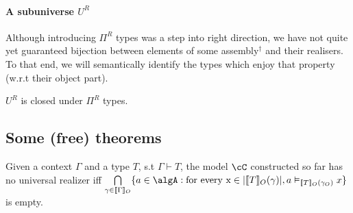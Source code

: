 \documentclass[12pt,a4paper]{article}
\def\src{_{src}}
\def\rfl{_{refl}}
\def\tgt{_{tgt}}
\renewcommand{\O}{_{O}}\alwaysmath{O}
\newcommand{\R}{\ensuremath{_{R}}}
\def\assembly{assembly$^\dagger$\xspace}
\begin{document}
\paragraph*{A subuniverse $U^R$}

Although introducing $\Pi^R$ types was a step into right direction, we have not quite yet guaranteed bijection between elements of some \assembly and their realisers. To that end, we will semantically identify the types which enjoy that property (w.r.t their object part).

\begin{claim}
  $U^R$ is closed under $\Pi^R$ types.
\end{claim}


\subsection{Some (free) theorems}
%

\begin{definition}
  Given a context $\Gamma$ and a type $T$, s.t $\Gamma \vdash  T$, the model $\cC$ constructed so far has no universal realizer iff $\bigcap\limits_{\gamma \in \llbracket\Gamma\rrbracket\O} \{ a \in \algA :  \text{for every x} \in \carr{\llbracket T\rrbracket \O(\gamma)}, a \vDash_{\llbracket T \rrbracket \O(\gamma\O)} x\}$ is empty.
\end{definition}
\end{document}
